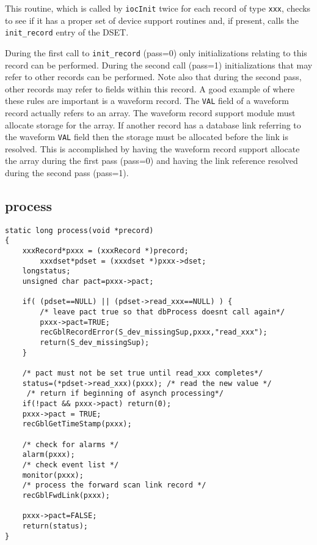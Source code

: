 This routine, which is called by \verb|iocInit| twice for each record of type \verb|xxx|, checks to see if it has a proper set of device support routines and, if present, calls the \verb|init_record| entry of the DSET.

During the first call to \verb|init_record| (pass=0) only initializations relating to this record can be performed.
During the second call (pass=1) initializations that may refer to other records can be performed.
Note also that during the second pass, other records may refer to fields within this record.
A good example of where these rules are important is a waveform record.
The \verb|VAL| field of a waveform record actually refers to an array.
The waveform record support module must allocate storage for the array.
If another record has a database link referring to the waveform \verb|VAL| field then the storage must be allocated before the link is resolved.
This is accomplished by having the waveform record support allocate the array during the first pass (pass=0) and having the link reference resolved during the second pass (pass=1).

\subsection{process}

\begin{verbatim}
static long process(void *precord)
{
    xxxRecord*pxxx = (xxxRecord *)precord;
        xxxdset*pdset = (xxxdset *)pxxx->dset;
    longstatus;
    unsigned char pact=pxxx->pact;

    if( (pdset==NULL) || (pdset->read_xxx==NULL) ) {
        /* leave pact true so that dbProcess doesnt call again*/
        pxxx->pact=TRUE;
        recGblRecordError(S_dev_missingSup,pxxx,"read_xxx");
        return(S_dev_missingSup);
    }

    /* pact must not be set true until read_xxx completes*/
    status=(*pdset->read_xxx)(pxxx); /* read the new value */
     /* return if beginning of asynch processing*/
    if(!pact && pxxx->pact) return(0);
    pxxx->pact = TRUE;
    recGblGetTimeStamp(pxxx);

    /* check for alarms */
    alarm(pxxx);
    /* check event list */
    monitor(pxxx);
    /* process the forward scan link record */
    recGblFwdLink(pxxx);

    pxxx->pact=FALSE;
    return(status);
}
\end{verbatim}

